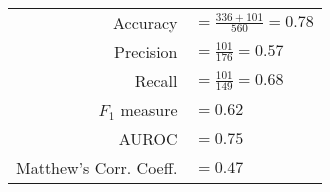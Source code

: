 \begin{tabular}{rl}
\rule{0pt}{12pt} Accuracy & $= \frac{336 + 101}{560} = 0.78$  \tabularnewline
\rule{0pt}{12pt} Precision & $= \frac{101}{176} = 0.57$ \tabularnewline
\rule{0pt}{12pt} Recall & $= \frac{101}{149} = 0.68$  \tabularnewline
\rule{0pt}{12pt} $F_1$ measure & $= 0.62$ \tabularnewline
\rule{0pt}{12pt} AUROC &$= 0.75$ \tabularnewline
\rule{0pt}{12pt} Matthew's Corr. Coeff. & $= 0.47$ \tabularnewline
\end{tabular}
